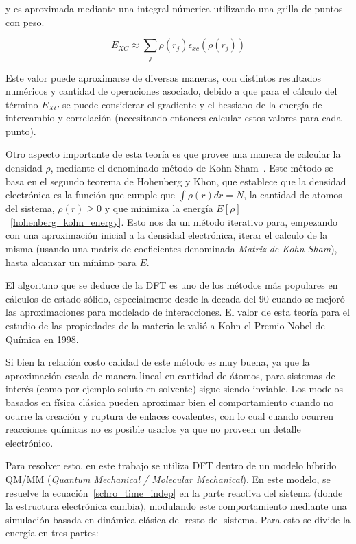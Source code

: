 y es aproximada mediante una integral n\'umerica utilizando una grilla de puntos con peso.

\begin{equation}
    \label{approx_excenergy}
    E_{XC} \approx \sum_j \rho(r_j) \epsilon_{xc} (\rho(r_j))
\end{equation}

Este valor puede aproximarse de diversas maneras, con distintos resultados num\'ericos y cantidad de operaciones
asociado, debido a que para el c\'alculo del t\'ermino $E_{XC}$ se puede considerar el gradiente
y el hessiano de la energ\'ia de intercambio y correlaci\'on (necesitando entonces calcular
estos valores para cada punto).

Otro aspecto importante de esta teor\'ia es que provee una manera de calcular la densidad $\rho$,
mediante el denominado m\'etodo de Kohn-Sham~\cite{KohnSham}. Este m\'etodo se basa en el segundo teorema
de Hohenberg y Khon, que establece que la densidad electr\'onica es la funci\'on que
cumple que $\int \rho(r) dr = N$, la cantidad de atomos del sistema, $\rho(r) \geq 0$ y que
minimiza la energ\'ia $E[\rho]$~\ref{hohenberg_kohn_energy}. Esto nos da
un m\'etodo iterativo para, empezando con una aproximaci\'on inicial a la densidad electr\'onica,
iterar el calculo de la misma (usando una matriz de coeficientes denominada \textit{Matriz de Kohn Sham}), hasta
alcanzar un m\'inimo para $E$.

El algoritmo que se deduce de la DFT es uno de los m\'etodos m\'as populares en c\'alculos
de estado s\'olido, especialmente desde la decada del 90 cuando se mejor\'o las aproximaciones para modelado de
interacciones. El valor de esta teor\'ia para el estudio de las propiedades de la materia le vali\'o a Kohn el Premio Nobel
de Qu\'imica en 1998.

Si bien la relaci\'on costo calidad de este m\'etodo es muy buena, ya que la aproximaci\'on escala de manera lineal
en cantidad de \'atomos, para sistemas de inter\'es (como por ejemplo soluto en solvente) sigue siendo inviable. Los
modelos basados en f\'isica cl\'asica pueden aproximar bien el comportamiento cuando no ocurre la creaci\'on y ruptura
de enlaces covalentes, con lo cual cuando ocurren reacciones qu\'imicas no es posible usarlos ya que no proveen un
detalle electr\'onico.

Para resolver esto, en este trabajo se utiliza DFT dentro de un modelo h\'ibrido QM/MM (\textit{Quantum Mechanical / Molecular Mechanical}).
En este modelo, se resuelve la ecuaci\'on~\ref{schro_time_indep} en la parte reactiva del sistema (donde la estructura
electr\'onica cambia), modulando este comportamiento mediante una simulaci\'on basada en din\'amica
cl\'asica del resto del sistema. Para esto se divide la energ\'ia en tres partes:

